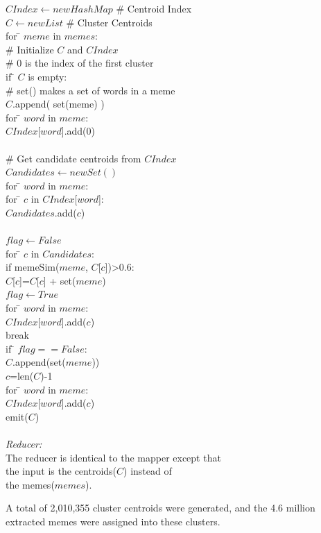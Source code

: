 \documentclass{sig-alternate}
\begin{document}
\begin{itemize}
\begin{centering}
\begin{tabbing}
$CIndex \leftarrow new HashMap$ \# Centroid Index\\
$C \leftarrow new List$ \# Cluster Centroids\\
for \= $meme$ in $memes$:\\
\>	\# Initialize $C$ and $CIndex$\\
\>	\# 0 is the index of the first cluster\\
\>	if \= $C$ is empty:\\
\>\>	\# set() makes a set of words in a meme\\
\>\>	$C$.append( set(meme) )\\
\>\>	for \= $word$ in $meme$:\\
\>\>\>		$CIndex$[$word$].add(0) \\
\\
\>	\# Get candidate centroids from $CIndex$\\
\>	$Candidates \leftarrow new Set()$\\
\>	for \= $word$ in $meme$:\\
\>\>		for \= $c$ in $CIndex$[$word$]:\\
\>\>\>		$Candidates$.add($c$)\\
\\
\>	$flag \leftarrow False$\\
\>	for \= $c$ in $Candidates$:\\
\>\>	if memeSim($meme$, $C$[$c$])>0.6:\\
\>\>\>		$C$[$c$]=$C$[$c$] + set($meme$)\\
\>\>\>	$flag \leftarrow True$\\
\>\>\>		for \= $word$ in $meme$:\\
\>\>\>\>		$CIndex$[$word$].add($c$) \\
\>\>\>		break
\\
\> if \= $flag == False$:\\
\>\>	$C$.append(set($meme$))\\
\>\>	$c$=len($C$)-1\\
\>\>		for \= $word$ in $meme$:\\
\>\>\>		$CIndex$[$word$].add($c$) \\
emit($C$)\\

\\
\emph{Reducer:}\\
\>The reducer is identical to the mapper except that \\
\> the input is the centroids($C$) instead of\\
\> the memes($memes$).\\

\end{tabbing}

\end{centering}

A total of 2,010,355 cluster centroids were generated, and the 4.6 million extracted memes were assigned into these clusters.
 
\end{itemize}
\end{document}
